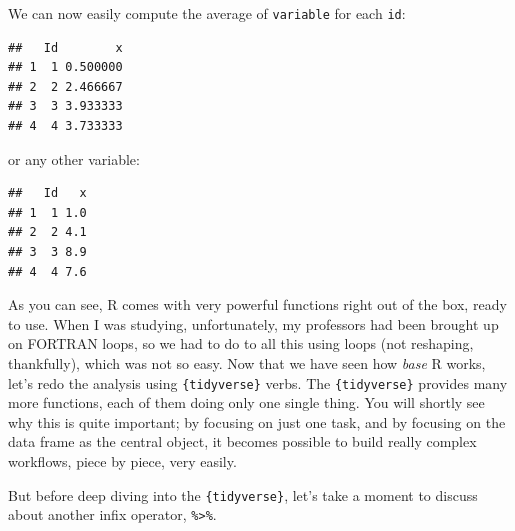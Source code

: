 \documentclass[
]{article}
\newenvironment{Shaded}{\begin{snugshade}}{\end{snugshade}}
\newcommand{\AttributeTok}[1]{\textcolor[rgb]{0.77,0.63,0.00}{#1}}
\newcommand{\FunctionTok}[1]{\textcolor[rgb]{0.00,0.00,0.00}{#1}}
\newcommand{\NormalTok}[1]{#1}
\newcommand{\SpecialCharTok}[1]{\textcolor[rgb]{0.00,0.00,0.00}{#1}}
\begin{document}
We can now easily compute the average of \texttt{variable} for each \texttt{id}:

\begin{Shaded}
\end{Shaded}

\begin{verbatim}
##   Id        x
## 1  1 0.500000
## 2  2 2.466667
## 3  3 3.933333
## 4  4 3.733333
\end{verbatim}

or any other variable:

\begin{Shaded}
\end{Shaded}

\begin{verbatim}
##   Id   x
## 1  1 1.0
## 2  2 4.1
## 3  3 8.9
## 4  4 7.6
\end{verbatim}

As you can see, R comes with very powerful functions right out of the box, ready to use. When I was
studying, unfortunately, my professors had been brought up on FORTRAN loops, so we had to do to all
this using loops (not reshaping, thankfully), which was not so easy.
Now that we have seen how \emph{base} R works, let's redo the analysis using \texttt{\{tidyverse\}} verbs.
The \texttt{\{tidyverse\}} provides many more functions, each of them doing only one single thing. You will
shortly see why this is quite important; by focusing on just one task, and by focusing on the data frame
as the central object, it becomes possible to build really complex workflows, piece by piece,
very easily.

But before deep diving into the \texttt{\{tidyverse\}}, let's take a moment to discuss about another infix
operator, \texttt{\%\textgreater{}\%}.
\end{document}

